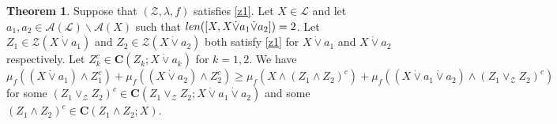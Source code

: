 \documentclass[a4paper,11pt,reqno]{article}
\theoremstyle{definition}
\newtheorem{theorem}{Theorem}[section]
\newcommand{\mA}{\mathcal{A}}
\newcommand{\mZ}{\mathcal{Z}}
\newcommand{\len}{\textup{len}}
\begin{document}
\begin{theorem}\label{lem:q-poly_mu_ineq}
    Suppose that $(\mZ, \lambda, f)$ satisfies \ref{z1}. Let $X \in \mathcal{L}$ and let $a_1, a_2 \in \mA(\mathcal{L}) \backslash \mA(X)$ such that $\len([X,X\dot\vee a_1\dot\vee a_2])=2$. Let
    $Z_1 \in \mathcal{Z}(X \dot\vee a_1)$ and $Z_2 \in \mathcal{Z}(X \dot\vee a_2)$ both satisfy \ref{z1} for $X\dot\vee a_1$ and $X\dot\vee a_2$ respectively. 
    Let $Z_k^c \in \mathbf{C}(Z_k; X \dot\vee a_k)$ for $k = 1, 2$. We have
    \begin{equation}\label{eq:mu_q-poly_ineq}
        \mu_f((X \dot\vee a_1) \wedge Z_1^c) + \mu_f((X \dot\vee a_2) \wedge Z_2^c) \geq \mu_f(X \wedge (Z_1 \wedge Z_2)^c) + \mu_f((X \dot\vee a_1 \dot\vee a_2) \wedge (Z_1 \vee_\mathcal{Z} Z_2)^c)
    \end{equation}
    for some $(Z_1 \vee_\mathcal{Z} Z_2)^c \in \mathbf{C}(Z_1 \vee_\mathcal{Z} Z_2; X \dot\vee a_1 \dot\vee a_2)$ and some $(Z_1 \wedge Z_2)^c \in \mathbf{C}(Z_1 \wedge Z_2; X)$.
\end{theorem}
\end{document}

